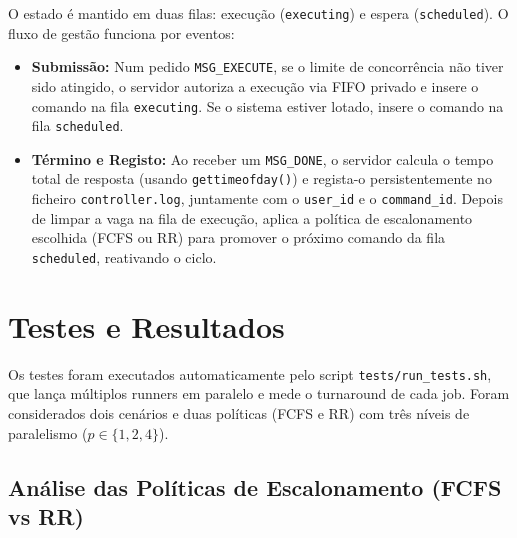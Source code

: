 \documentclass[runningheads,11pt]{llncs}
\begin{document}
        O estado é mantido em duas filas: execução (\texttt{executing}) e espera (\texttt{scheduled}). O fluxo de gestão funciona por eventos:
        \begin{itemize}
                \item \textbf{Submissão:} Num pedido \texttt{MSG\_EXECUTE}, se o limite de concorrência não tiver sido atingido, o servidor autoriza a execução via FIFO privado e insere o comando na fila \texttt{executing}. Se o sistema estiver lotado, insere o comando na fila \texttt{scheduled}.
                \item \textbf{Término e Registo:} Ao receber um \texttt{MSG\_DONE}, o servidor calcula o tempo total de resposta (usando \texttt{gettimeofday()}) e regista-o persistentemente no ficheiro \texttt{controller.log}, juntamente com o \texttt{user\_id} e o \texttt{command\_id}. Depois de limpar a vaga na fila de execução, aplica a política de escalonamento escolhida (FCFS ou RR) para promover o próximo comando da fila \texttt{scheduled}, reativando o ciclo.
        \end{itemize}

        \section{Testes e Resultados}

                Os testes foram executados automaticamente pelo script \texttt{tests/run\_tests.sh},
                que lança múltiplos runners em paralelo e mede o turnaround de cada job.
                Foram considerados dois cenários e duas políticas (FCFS e RR) com três níveis de paralelismo ($p \in \{1, 2, 4\}$).

                \subsection{Análise das Políticas de Escalonamento (FCFS vs RR)}
\end{document}
